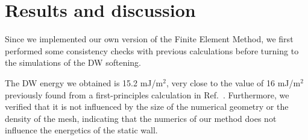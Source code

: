 \section{Results and discussion \label{sec:BTO_results}}
Since we implemented our own version of the Finite Element Method, we first performed some consistency checks with previous calculations before turning to the simulations of the DW softening.

The DW energy we obtained is 15.2 mJ/m$^2$, very close to the value of 16 mJ/m$^2$ previously found from a first-principles calculation in Ref.~\cite{Padilla1996}.
Furthermore, we verified that it is not influenced by the size of the numerical geometry or the density of the mesh, indicating that the numerics of our method does not influence the energetics of the static wall.

